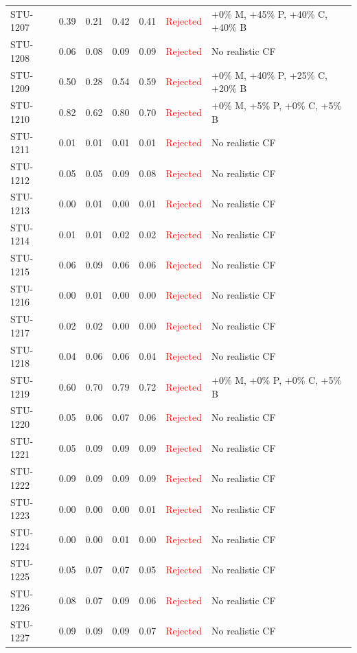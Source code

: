 \begin{longtable}{l c c c c | c | l}
STU-1207 & 0.39 & 0.21 & 0.42 & 0.41 & \textcolor{red}{Rejected} & +0\% M, +45\% P, +40\% C, +40\% B \\
STU-1208 & 0.06 & 0.08 & 0.09 & 0.09 & \textcolor{red}{Rejected} & No realistic CF \\
STU-1209 & 0.50 & 0.28 & 0.54 & 0.59 & \textcolor{red}{Rejected} & +0\% M, +40\% P, +25\% C, +20\% B \\
STU-1210 & 0.82 & 0.62 & 0.80 & 0.70 & \textcolor{red}{Rejected} & +0\% M, +5\% P, +0\% C, +5\% B \\
STU-1211 & 0.01 & 0.01 & 0.01 & 0.01 & \textcolor{red}{Rejected} & No realistic CF \\
STU-1212 & 0.05 & 0.05 & 0.09 & 0.08 & \textcolor{red}{Rejected} & No realistic CF \\
STU-1213 & 0.00 & 0.01 & 0.00 & 0.01 & \textcolor{red}{Rejected} & No realistic CF \\
STU-1214 & 0.01 & 0.01 & 0.02 & 0.02 & \textcolor{red}{Rejected} & No realistic CF \\
STU-1215 & 0.06 & 0.09 & 0.06 & 0.06 & \textcolor{red}{Rejected} & No realistic CF \\
STU-1216 & 0.00 & 0.01 & 0.00 & 0.00 & \textcolor{red}{Rejected} & No realistic CF \\
STU-1217 & 0.02 & 0.02 & 0.00 & 0.00 & \textcolor{red}{Rejected} & No realistic CF \\
STU-1218 & 0.04 & 0.06 & 0.06 & 0.04 & \textcolor{red}{Rejected} & No realistic CF \\
STU-1219 & 0.60 & 0.70 & 0.79 & 0.72 & \textcolor{red}{Rejected} & +0\% M, +0\% P, +0\% C, +5\% B \\
STU-1220 & 0.05 & 0.06 & 0.07 & 0.06 & \textcolor{red}{Rejected} & No realistic CF \\
STU-1221 & 0.05 & 0.09 & 0.09 & 0.09 & \textcolor{red}{Rejected} & No realistic CF \\
STU-1222 & 0.09 & 0.09 & 0.09 & 0.09 & \textcolor{red}{Rejected} & No realistic CF \\
STU-1223 & 0.00 & 0.00 & 0.00 & 0.01 & \textcolor{red}{Rejected} & No realistic CF \\
STU-1224 & 0.00 & 0.00 & 0.01 & 0.00 & \textcolor{red}{Rejected} & No realistic CF \\
STU-1225 & 0.05 & 0.07 & 0.07 & 0.05 & \textcolor{red}{Rejected} & No realistic CF \\
STU-1226 & 0.08 & 0.07 & 0.09 & 0.06 & \textcolor{red}{Rejected} & No realistic CF \\
STU-1227 & 0.09 & 0.09 & 0.09 & 0.07 & \textcolor{red}{Rejected} & No realistic CF \\

\end{longtable}
